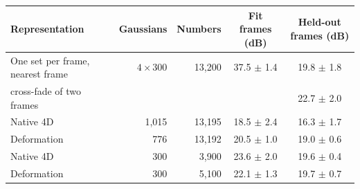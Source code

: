 \begin{tabular}{@{}lrrcc@{}}
\toprule
Representation & Gaussians & Numbers & Fit frames (dB) & Held-out frames (dB) \\
\midrule
One set per frame, nearest frame & $4\times300$ & 13{,}200 & 37.5 $\pm$ 1.4 & 19.8 $\pm$ 1.8 \\
\quad cross-fade of two frames & & & & 22.7 $\pm$ 2.0 \\
Native 4D & 1{,}015 & 13{,}195 & 18.5 $\pm$ 2.4 & 16.3 $\pm$ 1.7 \\
Deformation & 776 & 13{,}192 & 20.5 $\pm$ 1.0 & 19.0 $\pm$ 0.6 \\
\midrule
Native 4D & 300 & 3{,}900 & 23.6 $\pm$ 2.0 & 19.6 $\pm$ 0.4 \\
Deformation & 300 & 5{,}100 & 22.1 $\pm$ 1.3 & 19.7 $\pm$ 0.7 \\
\bottomrule
\end{tabular}
